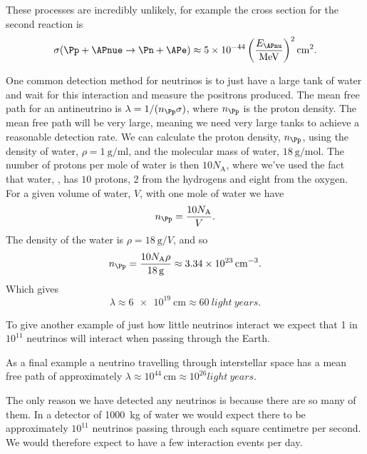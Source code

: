 \documentclass[fleqn]{NotesClass}
\newcommand*{\avogadro}{N_{\mathrm{A}}}
\begin{document}
    These processes are incredibly unlikely, for example the cross section for the second reaction is
    \begin{equation}
        \sigma(\Pp + \APnue \to \Pn + \APe) \approx 5\times10^{-44} \left( \frac{E_{\APnu}}{\unit{\mega\electronvolt}} \right)^2\unit{\centi\metre\squared}.
    \end{equation}
    
    One common detection method for neutrinos is to just have a large tank of water and wait for this interaction and measure the positrons produced.
    The mean free path for an antineutrino is \(\lambda = 1/(n_{\Pp}\sigma)\), where \(n_{\Pp}\) is the proton density.
    The mean free path will be very large, meaning we need very large tanks to achieve a reasonable detection rate.
    We can calculate the proton density, \(n_{\Pp}\), using the density of water, \(\rho = \qty{1}{\gram\per\milli\litre}\), and the molecular mass of water, \(\qty{18}{\gram\per\mole}\).
    The number of protons per mole of water is then \(10\avogadro\), where we've used the fact that water, , has \(10\) protons, 2 from the hydrogens and eight from the oxygen.
    For a given volume of water, \(V\), with one mole of water we have
    \begin{equation}
        n_{\Pp} = \frac{10\avogadro}{V}.
    \end{equation}
    The density of the water is \(\rho = \qty{18}{\gram}/V\), and so
    \begin{equation}
        n_{\Pp} = \frac{10\avogadro \rho}{\qty{18}{\gram}} \approx \qty{3.34e23}{\per\centi\metre\cubed}.
    \end{equation}
    Which gives
    \begin{equation}
        \lambda \approx \qty{6e19}{\centi\metre} \approx \qty{60}{light~years}.
    \end{equation}

    To give another example of just how little neutrinos interact we expect that 1 in \(10^{11}\) neutrinos will interact when passing through the Earth.
    
    As a final example a neutrino travelling through interstellar space has a mean free path of approximately \(\lambda \approx 10^{44}\,\unit{\centi\metre} \approx 10^{26}\unit{light~years}\).
    
    The only reason we have detected any neutrinos is because there are so many of them.
    In a detector of \qty{1000}{\kilogram} of water we would expect there to be approximately \(10^{11}\) neutrinos passing through each square centimetre per second.
    We would therefore expect to have a few interaction events per day.
    
\end{document}
